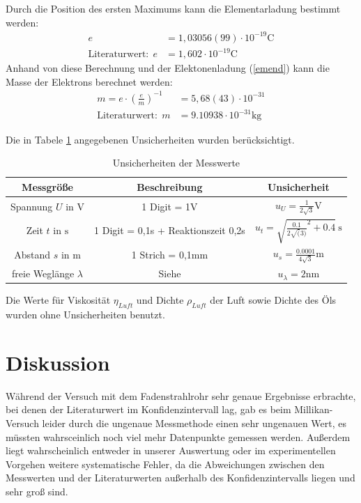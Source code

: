 \documentclass[11pt, a4paper]{article}
\begin{document}
    Durch die Position des ersten Maximums kann die Elementarladung bestimmt werden:
    \begin{align}
        e &= 1,03056(99) \cdot 10^{-19} \si{\coulomb} \\
        \text{Literaturwert:} \ \ e &= 1,602 \cdot 10^{-19} \si{\coulomb}
    \end{align}
    Anhand von diese Berechnung und der Elektonenladung (\ref{emend}) kann die Masse der Elektrons berechnet werden:
    \begin{align}
        m = e \cdot \left(\frac{e}{m}\right)^{-1} &= 5,68(43) \cdot 10^{-31}\\
        \text{Literaturwert:} \ \ m &= 9.10938 \cdot 10^{-31} \si{\kilogram}
    \end{align}

    Die in Tabele \ref{unsichmili} angegebenen Unsicherheiten wurden berücksichtigt.
    \begin{table}
        \begin{tabular}{c | c | c}
            Messgröße & Beschreibung & Unsicherheit \\ \hline
            Spannung $U$ in $\si{\volt}$ & 1 Digit = 1V & $u_U = \frac{1}{2\sqrt{3}} \si{\volt}$ \\
            Zeit $t$ in $\si{\second}$ & 1 Digit = 0,1s + Reaktionszeit 0,2s & $u_t = \sqrt{\frac{0.1}{2\sqrt(3)}^2 + 0.4} \ \si{\second}$ \\            Abstand $s$ in $\si{\metre}$ & 1 Strich = 0,1mm & $u_s = \frac{0.0001}{4\sqrt{3}} \si{\metre}$ \\
            freie Weglänge $\lambda$ & Siehe \cite{ELE} & $u_\lambda = 2 \si{\nano\metre}$ \\
        \end{tabular}
        \caption{Unsicherheiten der Messwerte}
        \label{unsichmili}
    \end{table}
    Die Werte für Viskosität $\eta_{Luft}$ und Dichte $\rho_{Luft}$ der Luft \cite[]{Luft} sowie Dichte des Öls \cite{ELE} wurden ohne Unsicherheiten benutzt.




    \section{Diskussion}
    Während der Versuch mit dem Fadenstrahlrohr sehr genaue Ergebnisse erbrachte, bei denen der Literaturwert im Konfidenzintervall lag, gab es beim Millikan-Versuch leider durch die ungenaue Messmethode einen sehr ungenauen Wert, es müssten wahrsceinlich noch viel mehr Datenpunkte gemessen werden. Außerdem liegt wahrscheinlich entweder in unserer Auswertung oder im experimentellen Vorgehen weitere systematische Fehler, da die Abweichungen zwischen den Messwerten und der Literaturwerten außerhalb des Konfidenzintervalls liegen und sehr groß sind.

    
    

    
    
\end{document}
